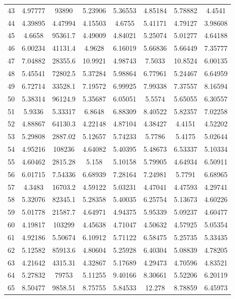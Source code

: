 \begin{figure}
\begin{tabular}{cccccccc}
43 & 4.97777 & 93890 & 5.23906 & 5.36553 & 4.85184 & 5.78882 & 4.4541\\
44 & 4.39895 & 4.47994 & 4.15503 & 4.6755 & 5.41171 & 4.79127 & 3.98608\\
45 & 4.6658 & 95361.7 & 4.49009 & 4.84021 & 5.25074 & 5.01277 & 4.64188\\
46 & 6.00234 & 41131.4 & 4.9628 & 6.16019 & 5.66836 & 5.66449 & 7.35777\\
47 & 7.04882 & 28355.6 & 10.9921 & 4.98743 & 7.5033 & 10.8524 & 6.00135\\
48 & 5.45541 & 72802.5 & 5.37284 & 5.98864 & 6.77961 & 5.24467 & 6.64959\\
49 & 6.72714 & 33528.1 & 7.19572 & 6.99925 & 7.99338 & 7.37557 & 8.16594\\
50 & 5.38314 & 96124.9 & 5.35687 & 6.05051 & 5.5574 & 5.65055 & 6.30557\\
51 & 5.9336 & 5.33317 & 6.8648 & 6.88309 & 8.40522 & 5.82357 & 7.02258\\
52 & 4.88867 & 64130.3 & 4.22148 & 4.87104 & 4.38427 & 4.4151 & 4.52202\\
53 & 5.29808 & 2887.02 & 5.12657 & 5.74233 & 5.7786 & 5.4175 & 5.02644\\
54 & 4.95216 & 108236 & 4.64082 & 5.40395 & 5.48673 & 6.53337 & 5.10334\\
55 & 4.60462 & 2815.28 & 5.158 & 5.10158 & 5.79905 & 4.64934 & 6.50911\\
56 & 6.01715 & 7.54336 & 6.68939 & 7.28164 & 7.24981 & 5.7791 & 6.68965\\
57 & 4.3483 & 16703.2 & 4.59122 & 5.03231 & 4.47041 & 4.47593 & 4.29741\\
58 & 5.32076 & 82345.1 & 5.28358 & 5.40035 & 6.25754 & 5.13673 & 4.60226\\
59 & 5.01778 & 21587.7 & 4.64971 & 4.94375 & 5.95339 & 5.09237 & 4.60477\\
60 & 4.19817 & 103299 & 4.45638 & 4.71047 & 4.50632 & 4.57925 & 5.05354\\
61 & 4.92186 & 5.50674 & 6.10912 & 5.71122 & 6.58475 & 5.25735 & 5.33435\\
62 & 5.12582 & 85913.6 & 4.80604 & 5.25928 & 6.40304 & 5.08839 & 4.78205\\
63 & 4.21642 & 4315.31 & 4.32867 & 5.17689 & 4.29473 & 4.70596 & 4.83521\\
64 & 5.27832 & 79753 & 5.11255 & 9.40166 & 8.30661 & 5.52206 & 6.20119\\
65 & 8.50477 & 9858.51 & 8.75755 & 5.84533 & 12.278 & 8.78859 & 6.45973\\

\end{tabular}
\end{figure}
